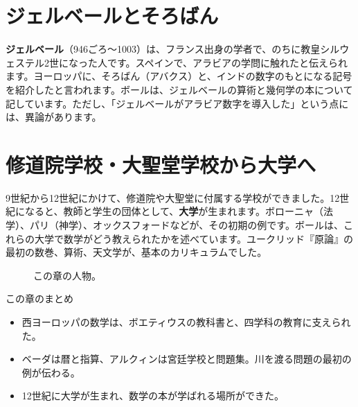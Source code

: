 \documentclass[a4paper,11pt,openany]{ltjsbook}
\begin{document}
\section{ジェルベールとそろばん}

\textbf{ジェルベール}（946ごろ〜1003）は、フランス出身の学者で、のちに教皇シルウェステル2世になった人です。スペインで、アラビアの学問に触れたと伝えられます。ヨーロッパに、そろばん（アバクス）と、インドの数字のもとになる記号を紹介したと言われます。ボールは、ジェルベールの算術と幾何学の本について記しています。ただし、「ジェルベールがアラビア数字を導入した」という点には、異論があります。

\section{修道院学校・大聖堂学校から大学へ}

9世紀から12世紀にかけて、修道院や大聖堂に付属する学校ができました。12世紀になると、教師と学生の団体として、\textbf{大学}が生まれます。ボローニャ（法学）、パリ（神学）、オックスフォードなどが、その初期の例です。ボールは、これらの大学で数学がどう教えられたかを述べています。ユークリッド『原論』の最初の数巻、算術、天文学が、基本のカリキュラムでした。

\begin{figure}[htbp]
\centering
{}
\caption{この章の人物。}
\end{figure}

\begin{pointbox}{この章のまとめ}
\begin{itemize}[leftmargin=*]
\item 西ヨーロッパの数学は、ボエティウスの教科書と、四学科の教育に支えられた。
\item ベーダは暦と指算、アルクィンは宮廷学校と問題集。川を渡る問題の最初の例が伝わる。
\item 12世紀に大学が生まれ、数学の本が学ばれる場所ができた。
\end{itemize}
\end{pointbox}
\end{document}

